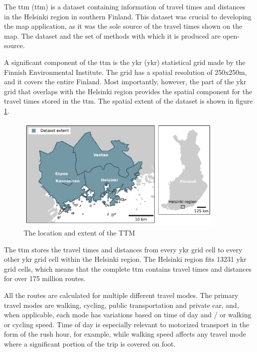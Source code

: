 The \acrlong{ttm} (\acrshort{ttm}) \parencite{fin2023}
is a dataset containing information of travel times and distances
in the Helsinki region in southern Finland.
This dataset was crucial to developing the map application,
as it was the sole source of the travel times shown on the map.
The dataset and the set of methods with which it is produced are open-source.

A significant component of the \acrshort{ttm} is the \acrlong{ykr} (\acrshort{ykr})
statistical grid made by the Finnish Environmental Institute.
The grid has a spatial resolution of 250x250m, and it covers the entire Finland.
Most importantly, however, the part of the \acrshort{ykr} grid that overlaps with
the Helsinki region provides the spatial component for
the travel times stored in the \acrshort{ttm}.
The spatial extent of the dataset is shown in figure \ref{fig:ttm extent}.

\begin{figure}[H]
	\centering
	\includegraphics[width=0.9\textwidth]{visual/figures/ttm/ttm_extent.pdf}
	\caption{The location and extent of the TTM}
	\label{fig:ttm extent}
\end{figure}

The \acrshort{ttm} stores the travel times and distances
from every \acrshort{ykr} grid cell to every other  \acrshort{ykr} grid cell
within the Helsinki region.
The Helsinki region fits 13231 \acrshort{ykr} grid cells,
which means that the complete \acrshort{ttm} contains travel times and distances for
over 175 million routes.

All the routes are calculated for multiple different travel modes.
The primary travel modes are walking, cycling, public transportation and private car,
and, when applicable, each mode has variations based on
time of day and / or walking or cycling speed.
Time of day is especially relevant to motorized transport
in the form of the rush hour, for example,
while walking speed affects any travel mode
where a significant portion of the trip is covered on foot.

